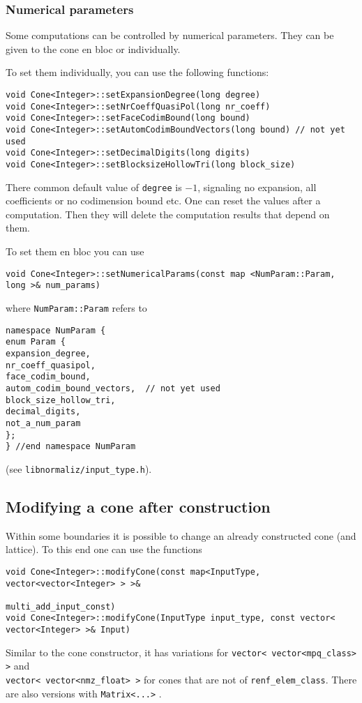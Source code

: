 \begin{small}
\subsubsection{Numerical parameters}

Some computations can be controlled by numerical parameters. They can be given to the cone en bloc or individually.

To set them individually, you can use the following functions:
\begin{Verbatim}
void Cone<Integer>::setExpansionDegree(long degree)
void Cone<Integer>::setNrCoeffQuasiPol(long nr_coeff)
void Cone<Integer>::setFaceCodimBound(long bound)
void Cone<Integer>::setAutomCodimBoundVectors(long bound) // not yet used
void Cone<Integer>::setDecimalDigits(long digits)
void Cone<Integer>::setBlocksizeHollowTri(long block_size)
\end{Verbatim}
There common default value of \verb|degree| is $-1$, signaling no expansion, all coefficients or no codimension bound etc. One can reset the values after a computation. Then they will delete the computation results that depend on them.

To set them en bloc you can use
\begin{Verbatim}
void Cone<Integer>::setNumericalParams(const map <NumParam::Param, long >& num_params)
\end{Verbatim}
where \verb|NumParam::Param| refers to
\begin{Verbatim}
namespace NumParam {
enum Param {
expansion_degree,
nr_coeff_quasipol,
face_codim_bound,
autom_codim_bound_vectors,  // not yet used
block_size_hollow_tri,
decimal_digits,
not_a_num_param
};
} //end namespace NumParam
\end{Verbatim}
(see \verb|libnormaliz/input_type.h|).

\subsection{Modifying a cone after construction}\label{Modify}

Within some boundaries it is possible to change an already constructed cone (and lattice). To this end one can use the functions
\begin{Verbatim}
void Cone<Integer>::modifyCone(const map<InputType, vector<vector<Integer> > >& 
                                                           multi_add_input_const)
void Cone<Integer>::modifyCone(InputType input_type, const vector< vector<Integer> >& Input)
\end{Verbatim}
Similar to the cone constructor, it has variations for \verb|vector< vector<mpq_class> >| and\\ \verb|vector< vector<nmz_float> >| for cones that are not of \verb|renf_elem_class|. There are also versions with \verb|Matrix<...>| .


\end{small}

